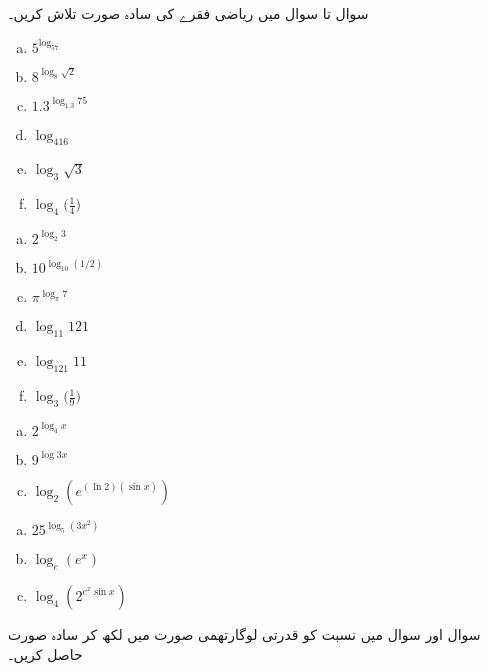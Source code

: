 

سوال  تا سوال  میں ریاضی فقرے کی سادہ صورت تلاش کریں۔

\begin{multicols}{3}
\begin{enumerate}[a.]
\item
$5^{\log_57}$
\item
$8^{\log_8\sqrt{2}}$
\item
$1.3^{\log_{1.3}75}$
\item
$\log_416$
\item
$\log_3\sqrt{3}$
\item
$\log_4\big(\frac{1}{4}\big)$
\end{enumerate}
\end{multicols}
\begin{multicols}{3}
\begin{enumerate}[a.]
\item
$2^{\log_2 3}$
\item
$10^{\log_{10}(1/2)}$
\item
$\pi^{\log_{\pi}7}$
\item
$\log_{11}121$
\item
$\log_{121}11$
\item
$\log_3\big(\frac{1}{9}\big)$
\end{enumerate}
\end{multicols}
\begin{multicols}{3}
\begin{enumerate}[a.]
\item
$2^{\log_4 x}$
\item
$9^{\log 3 x}$
\item
$\log_2(e^{(\ln 2)(\sin x)})$
\end{enumerate}
\end{multicols}
\begin{multicols}{3}
\begin{enumerate}[a.]
\item
$25^{\log_5(3x^2)}$
\item
$\log_e(e^x)$
\item
$\log_4(2^{e^x\sin x})$
\end{enumerate}
\end{multicols}
سوال  اور سوال  میں نسبت کو قدرتی لوگارتھمی صورت میں لکھ کر سادہ صورت حاصل کریں۔

